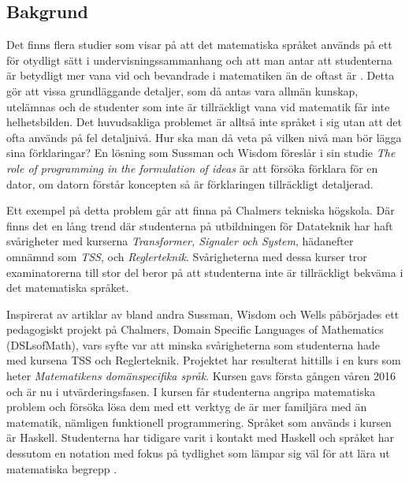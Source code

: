 \documentclass[12pt,a4paper,twoside,openright]{article}
\begin{document}
\subsection{Bakgrund}
%

Det finns flera studier som visar på att det matematiska språket
används på ett för otydligt sätt i undervisningssammanhang och att man
antar att studenterna är betydligt mer vana vid och bevandrade i
matematiken än de oftast är \cite{sussman2002role}
\cite{wells1995communicating}. Detta gör att vissa grundläggande
detaljer, som då antas vara allmän kunskap, utelämnas och de studenter
som inte är tillräckligt vana vid matematik får inte helhetsbilden.
Det huvudsakliga problemet är alltså inte språket i sig utan att det
ofta används på fel detaljnivå. Hur ska man då veta på vilken nivå man
bör lägga sina förklaringar? En lösning som Sussman och Wisdom
föreslår i sin studie \textit{The role of programming in the
  formulation of ideas} \cite{sussman2002role} är att försöka förklara
för en dator, om datorn förstår koncepten så är förklaringen
tillräckligt detaljerad.

Ett exempel på detta problem går att finna på Chalmers tekniska
högskola.  Där finns det en lång trend där studenterna på utbildningen
för Datateknik har haft svårigheter med kurserna \textit{Transformer,
 Signaler och System}, hädanefter omnämnd som \textit{TSS}, och
\textit{Reglerteknik}. Svårigheterna med dessa kurser tror
examinatorerna till stor del beror på att studenterna inte är
tillräckligt bekväma i det matematiska språket.

Inspirerat av artiklar av bland andra Sussman, Wisdom och Wells
påbörjades ett pedagogiskt projekt på Chalmers, Domain Specific
Languages of Mathematics (\gls{DSLsofMath}), vars syfte var att minska
svårigheterna som studenterna hade med kursena TSS och Reglerteknik.
Projektet har resulterat hittills i en kurs som heter
\textit{Matematikens domänspecifika språk}. Kursen gavs första gången
våren 2016 och är nu i utvärderingsfasen. I kursen får studenterna
angripa matematiska problem och försöka lösa dem med ett verktyg de är
mer familjära med än matematik, nämligen funktionell
programmering. Språket som används i kursen är Haskell. Studenterna
har tidigare varit i kontakt med Haskell och språket har dessutom en
notation med fokus på tydlighet som lämpar sig väl för att lära ut
matematiska begrepp \cite{TFPIE15_DSLsofMath_IonescuJansson}.
\end{document}
